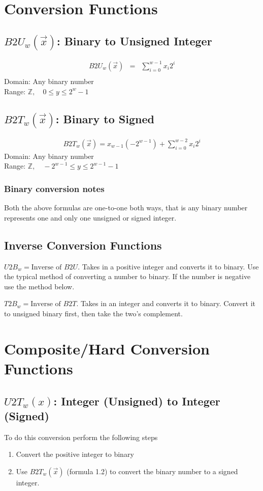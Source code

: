 \documentclass[12pt]{article}
\begin{document}
\section{Conversion Functions}
\subsection{$B2U_w(\vec{x})$: Binary to Unsigned Integer}
\begin{eqnarray*}
B2U_w(\vec{x})&=&\displaystyle \sum \limits_{i=0}^{w-1} x_{i} 2^i\\
\end{eqnarray*}
Domain: Any binary number\\
Range: $\mathbb{Z}, \quad 0\leq y \leq 2^w-1$

\subsection{$B2T_w( \vec{x} )$: Binary to Signed}
\begin{eqnarray*}
B2T_w( \vec{x} ) = x_{w-1} ({-2}^{w-1}) + \displaystyle \sum \limits_{i=0}^{w-2} x_{i} 2^i
\end{eqnarray*}
Domain: Any binary number\\
Range: $\mathbb{Z}, \quad -2^{w-1}\leq y \leq 2^{w-1}-1$

\subsubsection{Binary conversion notes}
Both the above formulas are one-to-one both ways, that is any binary number represents one and only one unsigned or signed integer.

\subsection{Inverse Conversion Functions}
$U2B_w=\text{Inverse of } B2U$. Takes in a positive integer and converts it to binary. Use the typical method of converting a number to binary. If the number is negative use the method below.

$T2B_w=\text{Inverse of } B2T$. Takes in an integer and converts it to binary. Convert it to unsigned binary first, then take the two's complement.
\newpage
\section{Composite/Hard Conversion Functions}
\subsection{$U2T_w(x)$: Integer (Unsigned) to Integer (Signed)}
To do this conversion perform the following steps
\begin{enumerate}
	\item Convert the positive integer to binary
	\item Use $B2T_w(\vec{x})$ (formula 1.2) to convert the binary number to a signed integer.
\end{enumerate}
\end{document}

